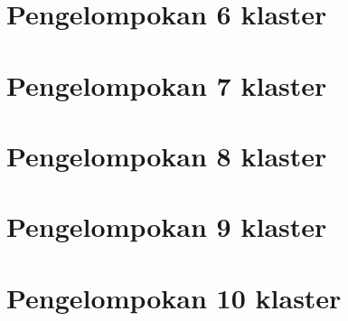 \section{Pengelompokan 6 klaster}
\section{Pengelompokan 7 klaster}
\section{Pengelompokan 8 klaster}
\section{Pengelompokan 9 klaster}
\section{Pengelompokan 10 klaster}






